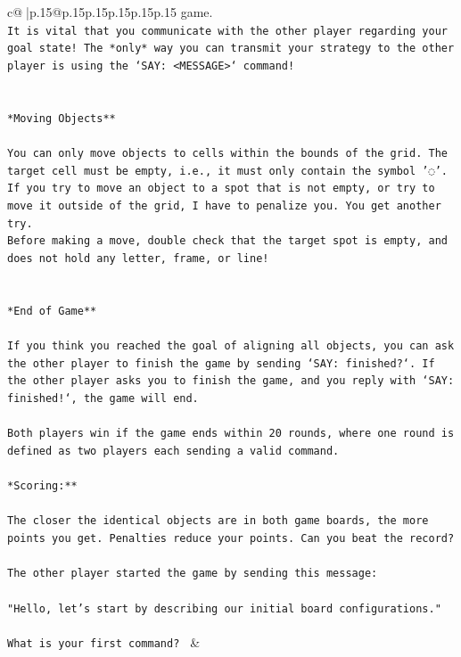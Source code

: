 \documentclass{article}
\begin{document}
{\begin{supertabular}{c@{$\;$}|p{.15\linewidth}@{}p{.15\linewidth}p{.15\linewidth}p{.15\linewidth}p{.15\linewidth}p{.15\linewidth}}
{{{game.\\ \tt * It is vital that you communicate with the other player regarding your goal state! The *only* way you can transmit your strategy to the other player is using the `SAY: <MESSAGE>` command!\\ \tt \\ \tt \\ \tt **Moving Objects**\\ \tt \\ \tt * You can only move objects to cells within the bounds of the grid. The target cell must be empty, i.e., it must only contain the symbol '◌'.\\ \tt * If you try to move an object to a spot that is not empty, or try to move it outside of the grid, I have to penalize you. You get another try.\\ \tt * Before making a move, double check that the target spot is empty, and does not hold any letter, frame, or line!\\ \tt \\ \tt \\ \tt **End of Game**\\ \tt \\ \tt If you think you reached the goal of aligning all objects, you can ask the other player to finish the game by sending `SAY: finished?`. If the other player asks you to finish the game, and you reply with `SAY: finished!`, the game will end.\\ \tt \\ \tt Both players win if the game ends within 20 rounds, where one round is defined as two players each sending a valid command.\\ \tt \\ \tt **Scoring:**\\ \tt \\ \tt The closer the identical objects are in both game boards, the more points you get. Penalties reduce your points. Can you beat the record?\\ \tt \\ \tt The other player started the game by sending this message:\\ \tt \\ \tt "Hello, let's start by describing our initial board configurations."\\ \tt \\ \tt What is your first command? 
	  } 
	   } 
	   } 
	 & \\ 
 

    \theutterance {}  


\end{supertabular}}
\end{document}
